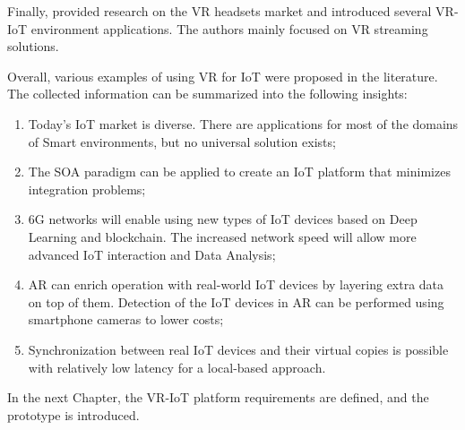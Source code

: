 Finally, \cite{hu_virtual_2021} provided research on the VR headsets market and introduced several VR-IoT environment applications. The authors mainly focused on VR streaming solutions.

Overall, various examples of using VR for IoT were proposed in the literature. The collected information can be summarized into the following insights:
\begin{enumerate}
    \item Today's IoT market is diverse. There are applications for most of the domains of Smart environments, but no universal solution exists;
   \item The SOA paradigm can be applied to create an IoT platform that minimizes integration problems;
    \item 6G networks will enable using new types of IoT devices based on Deep Learning and blockchain. The increased network speed will allow more advanced IoT interaction and Data Analysis;
    \item AR can enrich operation with real-world IoT devices by layering extra data on top of them. Detection of the IoT devices in AR can be performed using smartphone cameras to lower costs;
    \item Synchronization between real IoT devices and their virtual copies is possible with relatively low latency for a local-based approach.
\end{enumerate}

In the next Chapter, the VR-IoT platform requirements are defined, and the prototype is introduced.